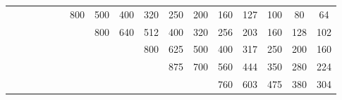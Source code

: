 \begin{xltabular}{\linewidth}{c CCCCCCCCCCCCCCCC}
		&			&			&			&			&			&	800	&	500	&	400	&	320	&	250	&	200	&	160	&	127	&	100	&	80		&	64 \\
		&			&			&			&			&			&			&	800	&	640	&	512	&	400	&	320	&	256	&	203	&	160	&	128	&	102 \\
		&			&			&			&			&			&			&			&			&	800	&	625	&	500	&	400	&	317	&	250	&	200	&	160 \\
		&			&			&			&			&			&			&			&			&			&	875	&	700	&	560	&	444	&	350	&	280	&	224 \\
		&			&			&			&			&			&			&			&			&			&			&			&	760	&	603	&	475	&	380	&	304 \\
\end{xltabular}



%

